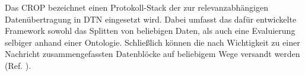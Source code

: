 Das \gls{CROP} bezeichnet einen Protokoll-Stack der zur relevanzabh{\"a}ngigen
Daten{\"u}bertragung in \gls{DTN} eingesetzt wird. Dabei
umfasst das daf{\"u}r entwickelte Framework sowohl das Splitten von beliebigen
Daten, als auch eine Evaluierung selbiger anhand einer Ontologie.
Schlie{\ss}lich k{\"o}nnen die nach Wichtigkeit zu einer Nachricht
zusammengefassten Datenbl{\"o}cke auf beliebigem Wege versandt werden (Ref.
\cite{Daher}).
